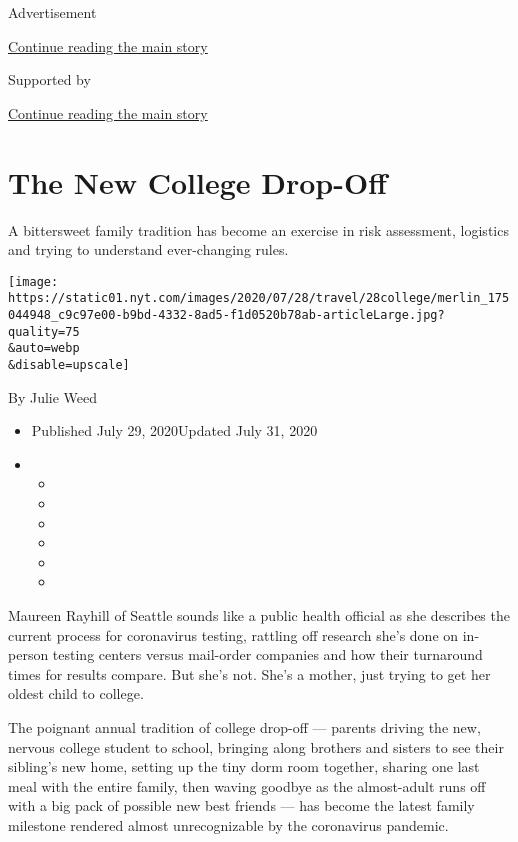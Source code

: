 Advertisement

\protect\hyperlink{after-top}{Continue reading the main story}

Supported by

\protect\hyperlink{after-sponsor}{Continue reading the main story}

\hypertarget{the-new-college-drop-off}{%
\section{The New College Drop-Off}\label{the-new-college-drop-off}}

A bittersweet family tradition has become an exercise in risk
assessment, logistics and trying to understand ever-changing rules.

\texttt{[image: https://static01.nyt.com/images/2020/07/28/travel/28college/merlin\_175044948\_c9c97e00-b9bd-4332-8ad5-f1d0520b78ab-articleLarge.jpg?quality=75\\\&auto=webp\\\&disable=upscale]}

By Julie Weed

\begin{itemize}
\item
  Published July 29, 2020Updated July 31, 2020
\item
  \begin{itemize}
  \item
  \item
  \item
  \item
  \item
  \item
  \end{itemize}
\end{itemize}

Maureen Rayhill of Seattle sounds like a public health official as she
describes the current process for coronavirus testing, rattling off
research she's done on in-person testing centers versus mail-order
companies and how their turnaround times for results compare. But she's
not. She's a mother, just trying to get her oldest child to college.

The poignant annual tradition of college drop-off --- parents driving
the new, nervous college student to school, bringing along brothers and
sisters to see their sibling's new home, setting up the tiny dorm room
together, sharing one last meal with the entire family, then waving
goodbye as the almost-adult runs off with a big pack of possible new
best friends --- has become the latest family milestone rendered almost
unrecognizable by the coronavirus pandemic.

